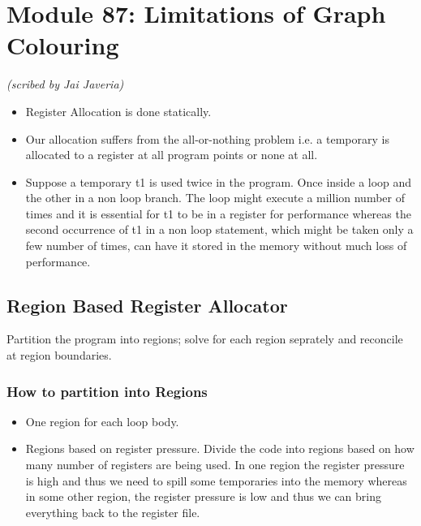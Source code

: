 \section{Module 87: Limitations of Graph Colouring}
\begin{flushright}
\textit{(scribed by Jai Javeria)}
\end{flushright}
\begin{itemize}
    \item Register Allocation is done statically. 
    \item Our allocation suffers from the all-or-nothing problem i.e. a temporary is allocated to a register at all program points or none at all.
    \item Suppose a temporary t1 is used twice in the program. Once inside a loop and the other in a non loop branch. The loop might execute a million number of times and it is essential for t1 to be in a register for performance whereas the second occurrence of t1 in a non loop statement, which might be taken only a few number of times, can have it stored in the memory without much loss of performance.
\end{itemize}
\subsection{Region Based Register Allocator}
Partition the program into regions; solve for each region seprately and reconcile at region boundaries.
\subsubsection{How to partition into Regions}
\begin{itemize}
    \item One region for each loop body.
    \item Regions based on register pressure. Divide the code into regions based on how many number of registers are being used. In one region the register pressure is high and thus we need to spill some temporaries into the memory whereas in some other region, the register pressure is low and thus we can bring everything back to the register file.
\end{itemize}
